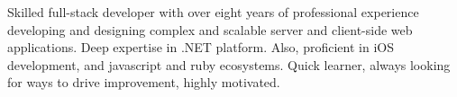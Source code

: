 

\begin{cvparagraph}

Skilled full-stack developer with over eight years of professional experience developing and designing complex and scalable server and client-side web applications. Deep expertise in .NET platform. Also, proficient in iOS development, and javascript and ruby ecosystems. Quick learner, always looking for ways to drive improvement, highly motivated.
\end{cvparagraph}
